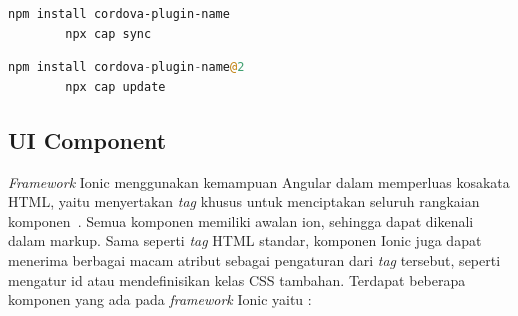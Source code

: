 \begin{lstlisting}[language=html, label={lst:installCordova}, caption=Kode untuk Memasang Cordova Plugins]
		npm install cordova-plugin-name
		npx cap sync
\end{lstlisting} 

\begin{lstlisting}[language=php, label={lst:updateCordova}, caption=Kode untuk Memperbarui Cordova Plugins]
		npm install cordova-plugin-name@2
		npx cap update
\end{lstlisting} 


\subsection{UI Component}
\label{subsec:uiComponent}
{\it Framework} Ionic menggunakan kemampuan Angular dalam memperluas kosakata HTML, yaitu menyertakan {\it tag} khusus untuk menciptakan seluruh rangkaian komponen~\cite{griffith:17:mobile}. Semua komponen memiliki awalan ion, sehingga dapat dikenali dalam markup. Sama seperti {\it tag} HTML standar, komponen Ionic juga dapat menerima berbagai macam atribut sebagai pengaturan dari {\it tag} tersebut, seperti mengatur id atau mendefinisikan kelas CSS tambahan. Terdapat beberapa komponen yang ada pada {\it framework} Ionic yaitu :
